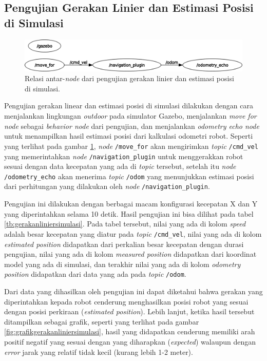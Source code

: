 \subsection{Pengujian Gerakan Linier dan Estimasi Posisi di Simulasi}
\label{subsec:liniersimulasi}

\begin{figure} [ht]
  \centering
  \includegraphics[scale=0.3]{gambar/rosgraph-navigation-plugin.png}
  \caption{Relasi antar-\emph{node} dari pengujian gerakan linier dan estimasi posisi di simulasi.}
  \label{fig:rosgraphnavigationplugin}
\end{figure}

Pengujian gerakan linear dan estimasi posisi di simulasi dilakukan dengan cara menjalankan lingkungan \emph{outdoor} pada simulator Gazebo,
  menjalankan \emph{move for node} sebagai \emph{behavior node} dari pengujian,
  dan menjalankan \emph{odometry echo node} untuk menampilkan hasil estimasi posisi dari kalkulasi odometri robot.
Seperti yang terlihat pada gambar \ref{fig:rosgraphnavigationplugin},
  \emph{node} \lstinline{/move_for} akan mengirimkan \emph{topic} \lstinline{/cmd_vel} yang memerintahkan \emph{node} \lstinline{/navigation_plugin} untuk menggerakkan robot sesuai dengan data kecepatan yang ada di \emph{topic} tersebut,
  setelah itu \emph{node} \lstinline{/odometry_echo} akan menerima \emph{topic} \lstinline{/odom} yang menunjukkan estimasi posisi dari perhitungan yang dilakukan oleh \emph{node} \lstinline{/navigation_plugin}.



Pengujian ini dilakukan dengan berbagai macam konfigurasi kecepatan X dan Y yang diperintahkan selama 10 detik.
Hasil pengujian ini bisa dilihat pada tabel \ref{tb:gerakanliniersimulasi}.
Pada tabel tersebut, nilai yang ada di kolom \emph{speed} adalah besar kecepatan yang diatur pada \emph{topic} \lstinline{/cmd_vel},
  nilai yang ada di kolom \emph{estimated position} didapatkan dari perkalian besar kecepatan dengan durasi pengujian,
  nilai yang ada di kolom \emph{measured position} didapatkan dari koordinat model yang ada di simulasi,
  dan terakhir nilai yang ada di kolom \emph{odometry position} didapatkan dari data yang ada pada \emph{topic} \lstinline{/odom}.

Dari data yang dihasilkan oleh pengujian ini dapat diketahui bahwa gerakan yang diperintahkan kepada robot cenderung menghasilkan posisi robot yang sesuai dengan posisi perkiraan (\emph{estimated position}).
Lebih lanjut, ketika hasil tersebut ditampilkan sebagai grafik,
  seperti yang terlihat pada gambar \ref{fig:grafikgerakanliniersimulasi},
  hasil yang didapatkan cenderung memiliki arah positif negatif yang sesuai dengan yang diharapkan (\emph{expected}) walaupun dengan \emph{error} jarak yang relatif tidak kecil (kurang lebih 1-2 meter).


